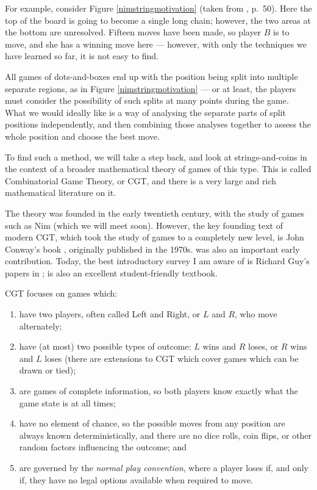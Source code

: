 \documentclass[a4paper,twocolumn]{article}
\begin{document}
For example, consider Figure \ref{nimstringmotivation} (taken from
\cite{berl}, p.\ 50). Here the top of the board is going to become a
single long chain; however, the two areas at the bottom are
unresolved. Fifteen moves have been made, so player $B$ is to move,
and she has a winning move here --- however, with only the techniques
we have learned so far, it is not easy to find.

\begin{figure*}
  \centering
  \def\svgscale{0.7}
  
  \caption{A $4 \times 5$ dots-and-boxes position with two
    unresolved regions}
  \label{nimstringmotivation}
\end{figure*}

All games of dots-and-boxes end up with the position being split into
multiple separate regions, as in Figure \ref{nimstringmotivation} ---
or at least, the players must consider the possibility of such splits
at many points during the game. What we would ideally like is a way of
analysing the separate parts of split positions independently, and
then combining those analyses together to assess the whole position
and choose the best move.

To find such a method, we will take a step back, and look at
strings-and-coins in the context of a broader mathematical theory of
games of this type. This is called Combinatorial Game Theory,
or CGT, and there is a very large and rich mathematical literature on
it.

The theory was founded in the early twentieth century, with the study
of games such as Nim (which we will meet soon). However, the key
founding text of modern CGT, which took the study of games to a
completely new level, is John Conway's book \cite{onag}, originally
published in the 1970s. \cite{wways} was also an important early
contribution. Today, the best introductory survey I am aware of is
Richard Guy's papers in \cite{nochance}; \cite{lip} is also an
excellent student-friendly textbook.

CGT focuses on games which:

\begin{enumerate}
  \item have two players, often called Left and Right, or $L$ and $R$,
    who move alternately;
  \item have (at most) two possible types of outcome: $L$ wins and $R$
    loses, or $R$ wins and $L$ loses (there are extensions to CGT
    which cover games which can be drawn or tied);
  \item are games of complete information, so both players know
    exactly what the game state is at all times;
  \item have no element of chance, so the possible moves from any
    position are always known deterministically, and there are no dice
    rolls, coin flips, or other random factors influencing the
    outcome; and
  \item are governed by the \emph{normal play convention}, where a
    player loses if, and only if, they have no legal options available
    when required to move.
\end{enumerate}
\end{document}
